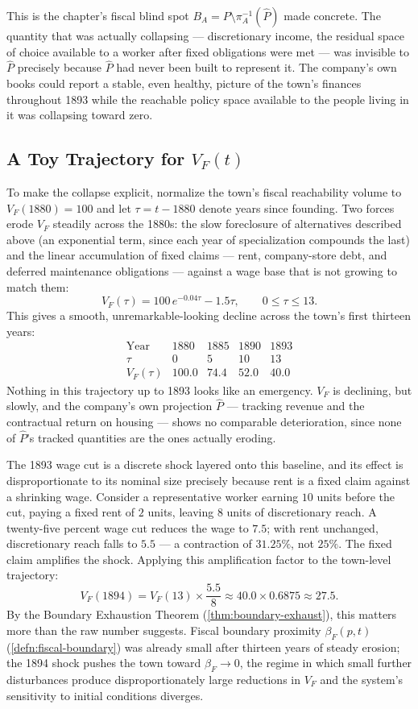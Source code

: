 \documentclass[12pt,twoside,openright]{book}
\begin{document}
This is the chapter's fiscal blind spot
$B_A = P \setminus \pi_A^{-1}(\hat{P})$ made concrete. The
quantity that was actually collapsing --- discretionary income,
the residual space of choice available to a worker after fixed
obligations were met --- was invisible to $\hat{P}$ precisely
because $\hat{P}$ had never been built to represent it. The
company's own books could report a stable, even healthy, picture
of the town's finances throughout 1893 while the reachable
policy space available to the people living in it was
collapsing toward zero.

\subsection{A Toy Trajectory for \texorpdfstring{$V_F(t)$}{V\_F(t)}}

To make the collapse explicit, normalize the town's fiscal
reachability volume to $V_F(1880) = 100$ and let
$\tau = t - 1880$ denote years since founding. Two forces erode
$V_F$ steadily across the 1880s: the slow foreclosure of
alternatives described above (an exponential term, since each
year of specialization compounds the last) and the linear
accumulation of fixed claims --- rent, company-store debt, and
deferred maintenance obligations --- against a wage base that is
not growing to match them:
\[
  V_F(\tau) = 100\,e^{-0.04\tau} - 1.5\tau,
  \qquad 0 \le \tau \le 13.
\]
This gives a smooth, unremarkable-looking decline across the
town's first thirteen years:
\[
  \begin{array}{c|cccc}
    \text{Year} & 1880 & 1885 & 1890 & 1893 \\
    \tau & 0 & 5 & 10 & 13 \\
    V_F(\tau) & 100.0 & 74.4 & 52.0 & 40.0
  \end{array}
\]
Nothing in this trajectory up to 1893 looks like an emergency.
$V_F$ is declining, but slowly, and the company's own
projection $\hat{P}$ --- tracking revenue and the contractual
return on housing --- shows no comparable deterioration, since
none of $\hat{P}$'s tracked quantities are the ones actually
eroding.

The 1893 wage cut is a discrete shock layered onto this baseline,
and its effect is disproportionate to its nominal size precisely
because rent is a fixed claim against a shrinking wage. Consider
a representative worker earning $10$ units before the cut, paying
a fixed rent of $2$ units, leaving $8$ units of discretionary
reach. A twenty-five percent wage cut reduces the wage to $7.5$;
with rent unchanged, discretionary reach falls to $5.5$ --- a
contraction of $31.25\%$, not $25\%$. The fixed claim amplifies
the shock. Applying this amplification factor to the town-level
trajectory:
\[
  V_F(1894) = V_F(13) \times \frac{5.5}{8} \approx 40.0 \times 0.6875
  \approx 27.5.
\]
By the Boundary Exhaustion Theorem (\cref{thm:boundary-exhaust}),
this matters more than the raw number suggests. Fiscal boundary
proximity $\beta_F(p,t)$ (\cref{defn:fiscal-boundary}) was
already small after thirteen years of steady erosion; the 1894
shock pushes the town toward $\beta_F \to 0$, the regime in which
small further disturbances produce disproportionately large
reductions in $V_F$ and the system's sensitivity to initial
conditions diverges.
\end{document}
